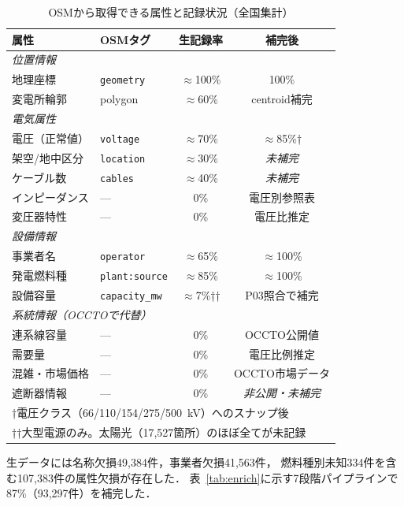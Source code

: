 \documentclass[fleqn]{ieej}
\begin{document}
\begin{table}[t]
  \caption{OSMから取得できる属性と記録状況（全国集計）}
  \label{tab:osm_attr}
  \centering\small
  \begin{tabular}{llcc}
    \toprule
    属性 & OSMタグ & 生記録率 & 補完後 \\
    \midrule
    \multicolumn{4}{l}{\textit{位置情報}}\\
    地理座標 & \texttt{geometry} & $\approx$100\% & 100\% \\
    変電所輪郭 & polygon & $\approx$60\% & centroid補完 \\
    \multicolumn{4}{l}{\textit{電気属性}}\\
    電圧（正常値） & \texttt{voltage} & $\approx$70\% & $\approx$85\%† \\
    架空/地中区分 & \texttt{location} & $\approx$30\% & \textit{未補完}\\
    ケーブル数 & \texttt{cables} & $\approx$40\% & \textit{未補完}\\
    インピーダンス & — & 0\% & 電圧別参照表 \\
    変圧器特性 & — & 0\% & 電圧比推定 \\
    \multicolumn{4}{l}{\textit{設備情報}}\\
    事業者名 & \texttt{operator} & $\approx$65\% & $\approx$100\% \\
    発電燃料種 & \texttt{plant:source} & $\approx$85\% & $\approx$100\% \\
    設備容量 & \texttt{capacity\_mw} & $\approx$7\%†† & P03照合で補完 \\
    \multicolumn{4}{l}{\textit{系統情報（OCCTOで代替）}}\\
    連系線容量 & — & 0\% & OCCTO公開値 \\
    需要量 & — & 0\% & 電圧比例推定 \\
    混雑・市場価格 & — & 0\% & OCCTO市場データ \\
    遮断器情報 & — & 0\% & \textit{非公開・未補完} \\
    \bottomrule
    \multicolumn{4}{l}{†電圧クラス（66/110/154/275/500~kV）へのスナップ後}\\
    \multicolumn{4}{l}{††大型電源のみ。太陽光（17,527箇所）のほぼ全てが未記録}\\
  \end{tabular}
\end{table}

生データには名称欠損49,384件，事業者欠損41,563件，
燃料種別未知334件を含む107,383件の属性欠損が存在した．
表~\ref{tab:enrich}に示す7段階パイプラインで87\%（93,297件）を補完した．
\end{document}
